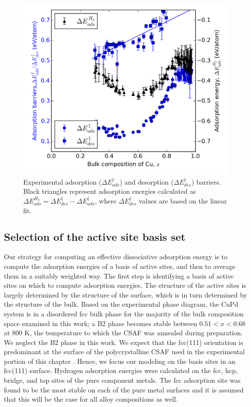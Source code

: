 \documentclass[12pt]{cmuthesis}
\begin{document}
\begin{figure}[h]
\centering
\includegraphics[width=5in]{./images/exp.png}
\caption{Experimental adsorption (\(\Delta E^{\ddagger}_{ads}\)) and desorption (\(\Delta E^{\ddagger}_{des}\)) barriers. Black triangles represent adsorption energies calculated as \(\Delta E^{H_{2}}_{ads} = \Delta E^{\ddagger}_{des} - \Delta E^{\ddagger}_{ads}\), where \(\Delta E^{\ddagger}_{des}\) values are based on the linear fit. \label{fig:exp-ads}}
\end{figure}

\subsection{Selection of the active site basis set}
\label{sec:orgacae447}
Our strategy for computing an effective dissociative adsorption energy is to compute the adsorption energies of a basis of active sites, and then to average them in a suitably weighted way. The first step is identifying a basis of active sites on which to compute adsorption energies. The structure of the active sites is largely determined by the structure of the surface, which is in turn determined by the structure of the bulk. Based on the experimental phase diagram, \cite{dowben-1990-surfac-segreg-phenom,subramanian-1991-cu-pd-pallad} the CuPd system is in a disordered fcc bulk phase for the majority of the bulk composition space examined in this work; a B2 phase becomes stable between \(0.51 < x < 0.68\) at 800 K, the temperature to which the CSAF was annealed during preparation. We neglect the B2 phase in this work. We expect that the  fcc(111) orientation is predominant at the surface of the polycrystalline CSAF used in the experimental portion of this chapter \cite{obrien-2012-h-d}. Hence, we focus our modeling on the basis sites in an fcc(111) surface. Hydrogen adsorption energies were calculated on the fcc, hcp, bridge, and top sites of the pure component metals. The fcc adsorption site was found to be the most stable on each of the pure metal surfaces and it is assumed that this will be the case for all alloy compositions as well.
\end{document}
